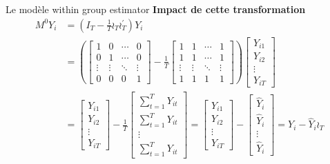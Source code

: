 \documentclass{beamer}
\begin{document}
\begin{frame}{Le modèle within group estimator}
\textbf{Impact de cette transformation}
\begin{align*}
M^0Y_i & = \left( I_T-\frac{1}{T}\wr_T\wr_T^{'}\right)Y_i  \\ & = \left(\begin{bmatrix} 
1 & 0 & \cdots & 0 \\
0 & 1 & \cdots & 0 \\
\vdots & \vdots & \ddots & \vdots \\
0 & 0 & 0 & 1
\end{bmatrix}-\frac{1}{T} \begin{bmatrix} 
1 & 1 & \cdots & 1 \\
1 & 1 & \cdots & 1 \\
\vdots & \vdots & \ddots & \vdots \\
1 & 1 & 1 & 1
\end{bmatrix}  \right)
\begin{bmatrix} 
Y_{i1}\\
Y_{i2}\\
\vdots\\
Y_{iT}
\end{bmatrix} \\ & = \begin{bmatrix} 
Y_{i1}\\
Y_{i2}\\
\vdots\\
Y_{iT}
\end{bmatrix} -\frac{1}{T} \begin{bmatrix} 
\sum_{t=1}^TY_{it}\\
\sum_{t=1}^TY_{it}\\
\vdots\\
\sum_{t=1}^TY_{it}
\end{bmatrix} = \begin{bmatrix} 
Y_{i1}\\
Y_{i2}\\
\vdots\\
Y_{iT}
\end{bmatrix}-\begin{bmatrix} 
\hat{Y}_i\\
\hat{Y}_i\\
\vdots\\
\hat{Y}_i
\end{bmatrix}= Y_i-\hat{Y}_i \wr_T
\end{align*}
\end{frame}
\end{document}
